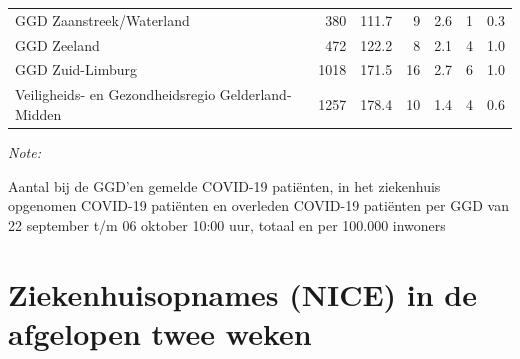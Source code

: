 \documentclass[
  english,
  man,floatsintext]{apa6}
\begin{document}
\begin{table}
\begin{threeparttable}
\begin{tabular}{lrrrrrr}
GGD Zaanstreek/Waterland & 380 & 111.7 & 9 & 2.6 & 1 & 0.3\\
GGD Zeeland & 472 & 122.2 & 8 & 2.1 & 4 & 1.0\\
GGD Zuid-Limburg & 1018 & 171.5 & 16 & 2.7 & 6 & 1.0\\
Veiligheids- en Gezondheidsregio Gelderland-Midden & 1257 & 178.4 & 10 & 1.4 & 4 & 0.6\\
\bottomrule
\end{tabular}
\begin{tablenotes}
\item \textit{Note: } 
\item Aantal bij de GGD’en gemelde COVID-19 patiënten, in het ziekenhuis opgenomen COVID-19 patiënten en overleden COVID-19 patiënten per GGD van 22 september t/m 06 oktober 10:00 uur, totaal en per 100.000 inwoners
\end{tablenotes}
\end{threeparttable}
\endgroup{}
\end{table}

\newpage

\hypertarget{ziekenhuisopnames-nice-in-de-afgelopen-twee-weken}{%
\section{Ziekenhuisopnames (NICE) in de afgelopen twee weken}\label{ziekenhuisopnames-nice-in-de-afgelopen-twee-weken}}
\end{document}
